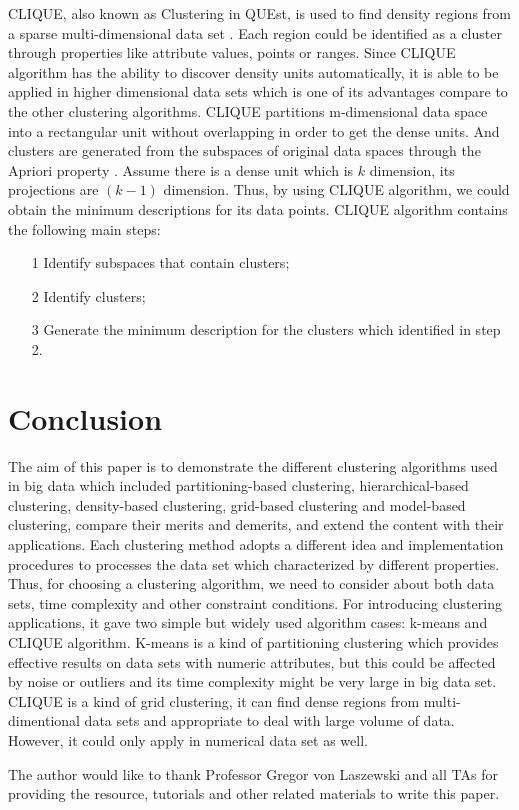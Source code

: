 \documentclass[sigconf]{acmart}
\begin{document}
CLIQUE, also known as Clustering in QUEst, is used to find density regions from a sparse multi-dimensional data set \cite{bdca}. Each region could be identified as a cluster through properties like attribute values, points or ranges. Since CLIQUE algorithm has the ability to discover density units automatically, it is able to be applied in higher dimensional data sets which is one of its advantages compare to the other clustering algorithms. CLIQUE partitions m-dimensional data space into a rectangular unit without overlapping in order to get the dense units. And clusters are generated from the subspaces of original data spaces through the Apriori property \cite{bdca}. Assume there is a dense unit which is $k$ dimension, its projections are $(k-1)$ dimension. Thus, by using CLIQUE algorithm, we could obtain the minimum descriptions for its data points. CLIQUE algorithm contains the following main steps:
\begin{itemize}
\item[1] Identify subspaces that contain clusters;
\item[2] Identify clusters;
\item[3] Generate the minimum description for the clusters which identified in step 2.
\end{itemize}

\section{Conclusion}

The aim of this paper is to demonstrate the different clustering algorithms used in big data which included partitioning-based clustering, hierarchical-based clustering, density-based clustering, grid-based clustering and model-based clustering, compare their merits and demerits, and extend the content with their applications. Each clustering method adopts a different idea and implementation procedures to processes the data set which characterized by different properties. Thus, for choosing a clustering algorithm, we need to consider about both data sets, time complexity and other constraint conditions. For introducing clustering applications, it gave two simple but widely used algorithm cases: k-means and CLIQUE algorithm. K-means is a kind of partitioning clustering which provides effective results on data sets with numeric attributes, but this could be affected by noise or outliers and its time complexity might be very large in big data set. CLIQUE is a kind of grid clustering, it can find dense regions from multi-dimentional data sets and appropriate to deal with large volume of data. However, it could only apply in numerical data set as well.

\begin{acks}

The author would like to thank Professor Gregor von Laszewski and all TAs for providing the resource, tutorials and other related materials to write this paper.

\end{acks}




% 
\end{document}
